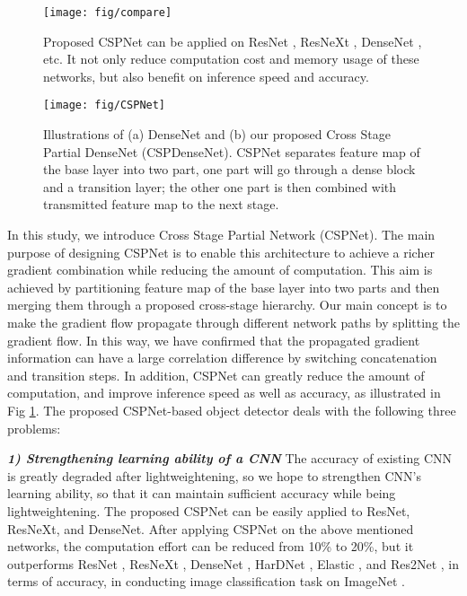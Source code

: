 \documentclass{article}
\begin{document}
\begin{figure}[t!]
	\begin{center}
		\texttt{[image: fig/compare]}
	\end{center}
	\caption{Proposed CSPNet can be applied on ResNet \cite{he2016deep}, ResNeXt \cite{xie2017aggregated}, DenseNet \cite{huang2017densely}, etc.  It not only reduce computation cost and memory usage of these networks, but also benefit on inference speed and accuracy.  }
	\label{fig:compare}
\end{figure}

\begin{figure*}[t]
	\begin{center}
		\texttt{[image: fig/CSPNet]}
	\end{center}
	\caption{Illustrations of (a) DenseNet and (b) our proposed Cross Stage Partial DenseNet (CSPDenseNet).  CSPNet separates feature map of the base layer into two part, one part will go through a dense block and a transition layer; the other one part is then combined with transmitted feature map to the next stage.  }
	\label{fig:cspnet}
\end{figure*}

In this study, we introduce Cross Stage Partial Network (CSPNet).  The main purpose of designing CSPNet is to enable this architecture to achieve a richer gradient combination while reducing the amount of computation.  This aim is achieved by partitioning feature map of the base layer into two parts and then merging them through a proposed cross-stage hierarchy.  Our main concept is to make the gradient flow propagate through different network paths by splitting the gradient flow.  In this way, we have confirmed that the propagated gradient information can have a large correlation difference by switching concatenation and transition steps.  In addition, CSPNet can greatly reduce the amount of computation, and improve inference speed as well as accuracy, as illustrated in Fig \ref{fig:compare}.  The proposed CSPNet-based object detector deals with the following three problems:

\textit{\textbf{1) Strengthening learning ability of a CNN }} The accuracy of existing CNN is greatly degraded after lightweightening, so we hope to strengthen CNN's learning ability, so that it can maintain sufficient accuracy while being lightweightening.  The proposed CSPNet can be easily applied to ResNet, ResNeXt, and DenseNet.  After applying CSPNet on the above mentioned networks, the computation effort can be reduced from 10\% to 20\%, but it outperforms ResNet \cite{he2016deep}, ResNeXt \cite{xie2017aggregated}, DenseNet \cite{huang2017densely}, HarDNet \cite{chao2019hardnet}, Elastic \cite{wang2019elastic}, and Res2Net \cite{gao2019res2net}, in terms of accuracy, in conducting image classification task on ImageNet \cite{deng2009imagenet}.
\end{document}
